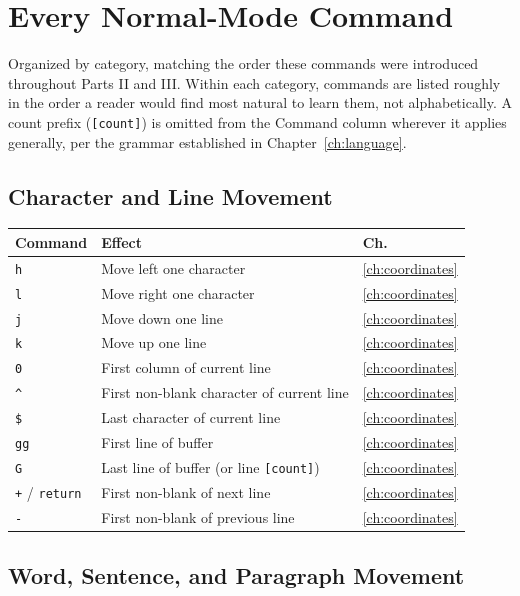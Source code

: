 \chapter{Every Normal-Mode Command}
\label{app:normal}

Organized by category, matching the order these commands were introduced throughout Parts II and III. Within each category, commands are listed roughly in the order a reader would find most natural to learn them, not alphabetically. A count prefix (\texttt{[count]}) is omitted from the Command column wherever it applies generally, per the grammar established in Chapter~\ref{ch:language}.

\section{Character and Line Movement}

\begin{longtable}{@{}l p{9cm} l@{}}
\textbf{Command} & \textbf{Effect} & \textbf{Ch.} \\
\hline
\endhead
\texttt{h} & Move left one character & \ref{ch:coordinates} \\
\texttt{l} & Move right one character & \ref{ch:coordinates} \\
\texttt{j} & Move down one line & \ref{ch:coordinates} \\
\texttt{k} & Move up one line & \ref{ch:coordinates} \\
\texttt{0} & First column of current line & \ref{ch:coordinates} \\
\texttt{\^{}} & First non-blank character of current line & \ref{ch:coordinates} \\
\texttt{\$} & Last character of current line & \ref{ch:coordinates} \\
\texttt{gg} & First line of buffer & \ref{ch:coordinates} \\
\texttt{G} & Last line of buffer (or line \texttt{[count]}) & \ref{ch:coordinates} \\
\texttt{+} / \texttt{return} & First non-blank of next line & \ref{ch:coordinates} \\
\texttt{-} & First non-blank of previous line & \ref{ch:coordinates} \\
\end{longtable}

\section{Word, Sentence, and Paragraph Movement}

